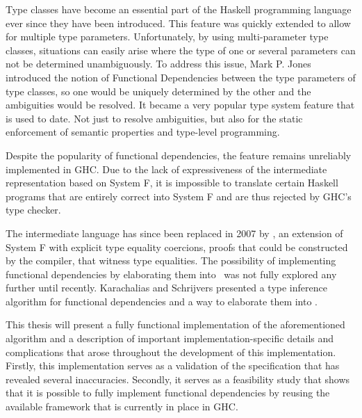Type classes have become an essential part of the Haskell programming language
ever since they have been introduced. This feature was quickly extended to allow
for multiple type parameters. Unfortunately, by using multi-parameter type
classes, situations can easily arise where the type of one or several parameters
can not be determined unambiguously. To address this issue, Mark P. Jones
introduced the notion of Functional Dependencies between the type parameters of
type classes, so one would be uniquely determined by the other and the
ambiguities would be resolved. It became a very popular type system feature that
is used to date.  Not just to resolve ambiguities, but also for the static
enforcement of semantic properties and type-level programming.

Despite the popularity of functional dependencies, the feature remains
unreliably implemented in GHC. Due to the lack of expressiveness of the
intermediate representation based on System F, it is impossible to translate
certain Haskell programs that are entirely correct into System F and are thus
rejected by GHC's type checker.

The intermediate language has since been replaced in 2007 by \systemfc, an
extension of System F with explicit type equality coercions, proofs that could
be constructed by the compiler, that witness type equalities. The possibility of
implementing functional dependencies by elaborating them into \systemfc~was not
fully explored any further until recently. Karachalias and
Schrijvers\cite{Karachalias:2017:EFD:3156695.3122966} presented a type inference
algorithm for functional dependencies and a way to elaborate them into
\systemfc.

This thesis will present a fully functional implementation of the aforementioned
algorithm and a description of important implementation-specific details and
complications that arose throughout the development of this implementation.
Firstly, this implementation serves as a validation of the specification that
has revealed several inaccuracies. Secondly, it serves as a feasibility study
that shows that it is possible to fully implement functional dependencies by
reusing the available framework that is currently in place in GHC.
